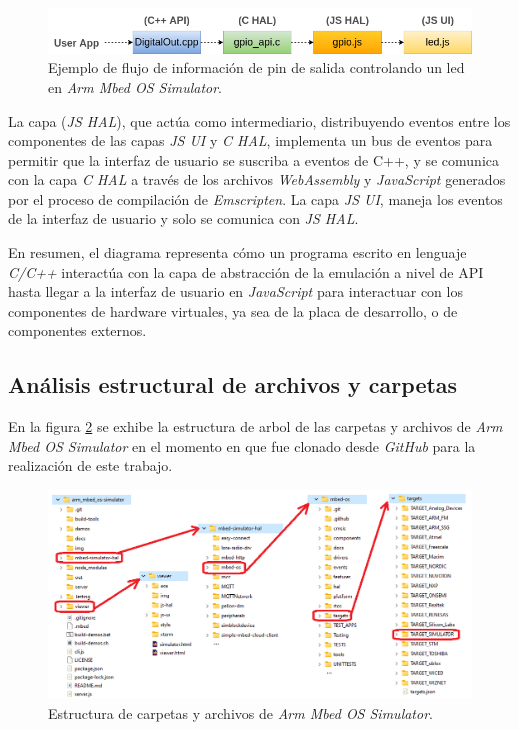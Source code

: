 \begin{figure}[ht]
	\centering
	\includegraphics[scale=.50]{./Figures/flujoGpio-LedMbed.png}
	\caption{Ejemplo de flujo de información de pin de salida controlando un led en \textit{Arm Mbed OS Simulator}.}
	\label{fig:flujoGpio-LedMbed}
\end{figure}

La capa (\textit{JS HAL}), que actúa como intermediario, distribuyendo eventos entre los componentes de las capas \textit{JS UI} y \textit{C HAL}, implementa un bus de eventos para permitir que la interfaz de usuario se suscriba a eventos de C++, y se comunica con la capa \textit{C HAL} a través de los archivos \textit{WebAssembly} y \textit{JavaScript} generados por el proceso de compilación de \textit{Emscripten}. La capa \textit{JS UI}, maneja los eventos de la interfaz de usuario y solo se comunica con \textit{JS HAL}.

En resumen, el diagrama representa cómo un programa escrito en lenguaje \textit{C/C++} interactúa con la capa de abstracción de la emulación a nivel de API hasta llegar a la interfaz de usuario en \textit{JavaScript} para interactuar con los componentes de hardware virtuales, ya sea de la placa de desarrollo, o de componentes externos. 

\subsection{Análisis estructural de archivos y carpetas}

En la figura \ref{fig:estructuraMbed1} se exhibe la estructura de arbol de las carpetas y archivos de \textit{Arm Mbed OS Simulator} en el momento en que fue clonado desde \textit{GitHub}  para la realización de este trabajo.

\begin{figure}[ht]
	\centering
	\includegraphics[scale=.50]{./Figures/carpetasYArchivosMbedOS.png}
	\caption{Estructura de carpetas y archivos de \textit{Arm Mbed OS Simulator}.}
	\label{fig:estructuraMbed1}
\end{figure}

